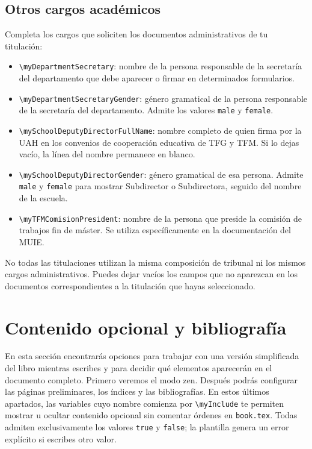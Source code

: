 \subsection{Otros cargos académicos}
\label{sec:otros-cargos-configuracion}

Completa los cargos que soliciten los documentos administrativos de tu titulación:

\begin{itemize}
  \item \texttt{\textbackslash{}myDepartmentSecretary}: nombre de la persona responsable de la secretaría del departamento que debe aparecer o firmar en determinados formularios.
  \item \texttt{\textbackslash{}myDepartmentSecretaryGender}: género gramatical de la persona responsable de la secretaría del departamento. Admite los valores \texttt{male} y \texttt{female}.
  \item \texttt{\textbackslash{}mySchoolDeputyDirectorFullName}: nombre completo de quien firma por la UAH en los convenios de cooperación educativa de TFG y TFM. Si lo dejas vacío, la línea del nombre permanece en blanco.
  \item \texttt{\textbackslash{}mySchoolDeputyDirectorGender}: género gramatical de esa persona. Admite \texttt{male} y \texttt{female} para mostrar Subdirector o Subdirectora, seguido del nombre de la escuela.
  \item \texttt{\textbackslash{}myTFMComisionPresident}: nombre de la persona que preside la comisión de trabajos fin de máster. Se utiliza específicamente en la documentación del MUIE.
\end{itemize}

No todas las titulaciones utilizan la misma composición de tribunal ni los mismos cargos administrativos. Puedes dejar vacíos los campos que no aparezcan en los documentos correspondientes a la titulación que hayas seleccionado.

\section{Contenido opcional y bibliografía}
\label{sec:elementos-opcionales-configuracion}

En esta sección encontrarás opciones para trabajar con una versión simplificada del libro mientras escribes y para decidir qué elementos aparecerán en el documento completo. Primero veremos el modo zen. Después podrás configurar las páginas preliminares, los índices y las bibliografías. En estos últimos apartados, las variables cuyo nombre comienza por \texttt{\textbackslash{}myInclude} te permiten mostrar u ocultar contenido opcional sin comentar órdenes en \texttt{book.tex}. Todas admiten exclusivamente los valores \texttt{true} y \texttt{false}; la plantilla genera un error explícito si escribes otro valor.

